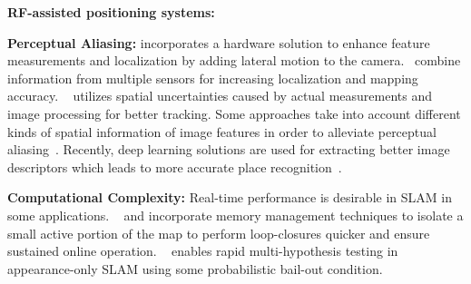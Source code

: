 \textbf{RF-assisted positioning systems:} 

\textbf{Perceptual Aliasing:} %
\cite{cam-oscillations} incorporates a hardware solution to enhance feature measurements and localization by adding lateral motion to the camera.~\cite{sens-fus-2,sens-fus-3} combine information from multiple sensors for increasing localization and mapping accuracy.
~\cite{feature_spatial_1} utilizes spatial uncertainties caused by actual measurements and image processing for better tracking.
Some approaches take into account different kinds of spatial information of image features in order to alleviate perceptual aliasing~\cite{feature_spatial_3}. %
Recently, deep learning solutions are used for extracting better image descriptors which leads to more accurate place recognition~\cite{perceptual_aliasing1}.

\textbf{Computational Complexity:} Real-time performance is desirable in SLAM in some applications.
~\cite{memory_management2} and \cite{memory_management} incorporate memory management techniques to isolate a small active portion of the map to perform loop-closures quicker and ensure sustained online operation.
~\cite{computational_complexity1} enables rapid multi-hypothesis testing in appearance-only SLAM using some probabilistic bail-out condition.

